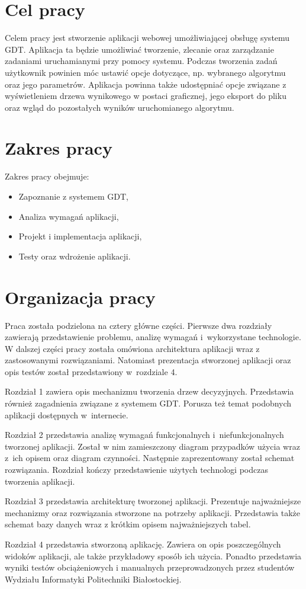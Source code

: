 \section*{Cel pracy}
Celem pracy jest stworzenie aplikacji webowej umożliwiającej obsługę systemu GDT. Aplikacja ta będzie umożliwiać tworzenie, zlecanie oraz zarządzanie zadaniami uruchamianymi przy pomocy systemu. Podczas tworzenia zadań użytkownik powinien móc ustawić opcje dotyczące, np. wybranego algorytmu oraz jego parametrów. Aplikacja powinna także udostępniać opcje związane z wyświetleniem drzewa wynikowego w postaci graficznej, jego eksport do pliku oraz wgląd do pozostałych wyników uruchomianego algorytmu.
\section*{Zakres pracy}
Zakres pracy obejmuje: 

\begin{itemize}
\item Zapoznanie z systemem GDT,
\item Analiza wymagań aplikacji,
\item Projekt i implementacja aplikacji, 
\item Testy oraz wdrożenie aplikacji.
\end{itemize}


\section*{Organizacja pracy}
Praca została podzielona na cztery główne części. Pierwsze dwa rozdziały zawierają przedstawienie problemu, analizę wymagań i~wykorzystane technologie. W dalszej części pracy została omówiona architektura aplikacji wraz z zastosowanymi rozwiązaniami. Natomiast prezentacja stworzonej aplikacji oraz opis testów został przedstawiony w~rozdziale 4.

Rozdział 1 zawiera opis mechanizmu tworzenia drzew decyzyjnych. Przedstawia również zagadnienia związane z systemem GDT. Porusza też temat podobnych aplikacji dostępnych w~internecie.

Rozdział 2 przedstawia analizę wymagań funkcjonalnych i~niefunkcjonalnych tworzonej aplikacji. Został w nim zamieszczony diagram przypadków użycia wraz z~ich opisem oraz diagram czynności. Następnie zaprezentowany został schemat rozwiązania. Rozdział kończy przedstawienie użytych technologi podczas tworzenia aplikacji.

Rozdział 3 przedstawia architekturę tworzonej aplikacji. Prezentuje najważniejsze mechanizmy oraz rozwiązania stworzone na potrzeby aplikacji. Przedstawia także schemat bazy danych wraz z krótkim opisem najważniejszych tabel.

Rozdział 4 przedstawia stworzoną aplikację. Zawiera on opis poszczególnych widoków aplikacji, ale także przykładowy sposób ich użycia. Ponadto przedstawia wyniki testów obciążeniowych i manualnych przeprowadzonych przez studentów Wydziału Informatyki Politechniki Białostockiej.